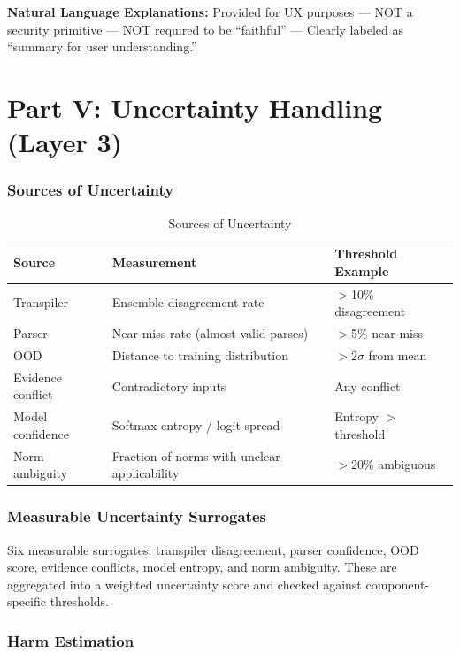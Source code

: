 \documentclass[11pt,letterpaper]{article}
\theoremstyle{definition}
\theoremstyle{remark}
\begin{document}
\textbf{Natural Language Explanations:} Provided for UX purposes --- NOT a security primitive --- NOT required to be ``faithful'' --- Clearly labeled as ``summary for user understanding.''



\part*{Part V: Uncertainty Handling (Layer 3)}

\section{Sources of Uncertainty}

\begin{table}[h]
\centering
\begin{tabular}{@{}lll@{}}
\toprule
\textbf{Source} & \textbf{Measurement} & \textbf{Threshold Example} \\
\midrule
Transpiler & Ensemble disagreement rate & $>$10\% disagreement \\
Parser & Near-miss rate (almost-valid parses) & $>$5\% near-miss \\
OOD & Distance to training distribution & $>2\sigma$ from mean \\
Evidence conflict & Contradictory inputs & Any conflict \\
Model confidence & Softmax entropy / logit spread & Entropy $>$ threshold \\
Norm ambiguity & Fraction of norms with unclear applicability & $>$20\% ambiguous \\
\bottomrule
\end{tabular}
\caption{Sources of Uncertainty}
\end{table}

\section{Measurable Uncertainty Surrogates}

Six measurable surrogates: transpiler disagreement, parser confidence, OOD score, evidence conflicts, model entropy, and norm ambiguity. These are aggregated into a weighted uncertainty score and checked against component-specific thresholds.

\section{Harm Estimation}
\end{document}
